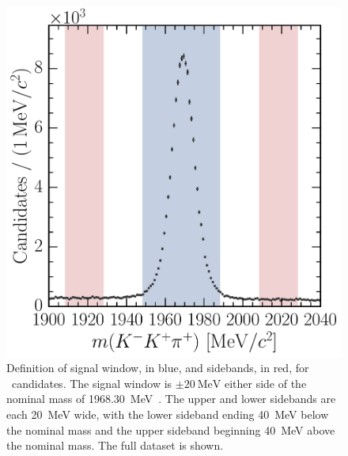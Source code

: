 \begin{figure}
  \centering
  \includegraphics[width=\textwidth]{figures/production/fitting/DsToKKpi_mass_offline_selection_regions}
  \caption{%
    Definition of signal window, in blue, and sidebands, in red, for 
    \DspTophipi\ candidates.
    The signal window is $\pm\SI{20}{\MeV}$ either side of the nominal \PDsplus 
    mass of \SI{1968.30}{\MeV}~\cite{PDG2014}.
    The upper and lower sidebands are each \SI{20}{\MeV} wide, with the lower 
    sideband ending \SI{40}{\MeV} below the nominal \PDsplus mass and the upper 
    sideband beginning \SI{40}{\MeV} above the nominal \PDsplus mass.
    The full dataset is shown.
  }
  \label{fig:prod:fitting:regions:DsToKKpi}
\end{figure}

